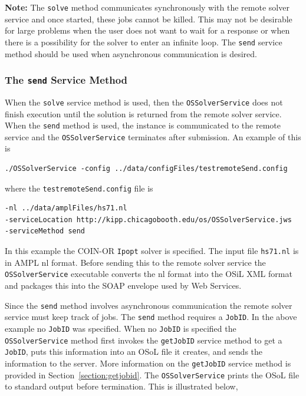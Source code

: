 \documentclass[11pt]{article}
\renewcommand{\_}{{\char"5F}}
\renewcommand{\{}{{\char"7B}}
\renewcommand{\}}{{\char"7D}}
\renewcommand{\^}{{\char"0D}}
\renewcommand{\'}{{\char"0D}}
\begin{document}
\begin{enumerate}[Step 1:]
{\bf Note:} The {\tt solve} method communicates synchronously with the remote solver service
and once started, these jobs cannot be killed. This may not be desirable for large
problems when the user does not want to wait for a response or when there is a possibility
for the solver to enter an infinite loop. The {\tt send} service
method should be used when asynchronous communication is desired.


\subsubsection{The  {\tt send} Service Method}\label{section:send}

When the {\tt solve} service method is used, then the {\tt OSSolverService} does not
finish execution until the solution is returned from the remote solver service.
 When the {\tt send}
method is used, the instance is communicated to the remote service and the
{\tt OSSolverService} terminates after submission. An example of this is
\begin{verbatim}
./OSSolverService -config ../data/configFiles/testremoteSend.config
\end{verbatim}
where the {\tt testremoteSend.config} file is
\begin{verbatim}
-nl ../data/amplFiles/hs71.nl
-serviceLocation http://kipp.chicagobooth.edu/os/OSSolverService.jws
-serviceMethod send
\end{verbatim}
In this example the COIN-OR {\tt Ipopt} solver is specified. The input file {\tt hs71.nl}
is in AMPL nl format.
Before sending this to the remote solver service the {\tt OSSolverService} executable converts  
the nl format into the OSiL XML format and packages this 
into the SOAP envelope used by Web Services.

Since the {\tt send} method involves asynchronous communication the remote solver service must keep track of jobs.
The {\tt send} method requires a {\tt JobID}. In the above example no {\tt JobID} was specified.
When no {\tt JobID} is specified the {\tt OSSolverService} method first invokes the {\tt getJobID} service method
to get a {\tt JobID}, puts this information into an OSoL file it creates, and sends the information
to the server. More information on the {\tt getJobID} service method is provided in Section~\ref{section:getjobid}.
The {\tt OSSolverService} prints the OSoL file to standard output before termination.
This is illustrated below,


\end{enumerate}
\end{document}
